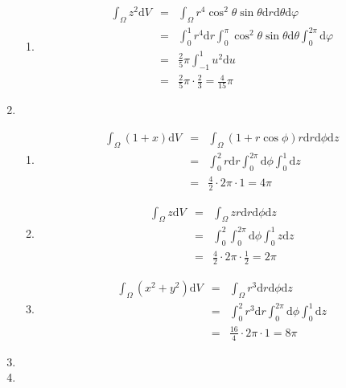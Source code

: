 \documentclass{jarticle}
\def\d{\mathrm d}
\begin{document}
\begin{enumerate}
\begin{enumerate}
        \item
          \begin{eqnarray*}
            \int_\Omega z^2 \d V & = & \int_\Omega r^4 \cos^2 \theta \sin \theta \d r \d \theta \d \varphi \\
            & = & \int_0^1 r^4 \d r \int_0^{\pi} \cos^2 \theta \sin \theta \d \theta \int_0^{2\pi} \d \varphi \\
            & = & \frac{2}{5} \pi \int_{-1}^{1} u^2 \d u \\
            & = & \frac{2}{5} \pi \cdot \frac{2}{3} = \frac{4}{15} \pi
          \end{eqnarray*}
      \end{enumerate}
    \item
      \begin{enumerate}
        \item
          \begin{eqnarray*}
            \int_\Omega (1+x) \d V & = & \int_\Omega (1+r \cos \phi) r \d r \d \phi \d z \\
            & = & \int_0^2 r \d r \int_0^{2\pi} \d \phi \int_0^1 \d z \\
            & = & \frac{4}{2} \cdot 2\pi \cdot 1 = 4 \pi
          \end{eqnarray*}
        \item
          \begin{eqnarray*}
            \int_\Omega z \d V & = & \int_\Omega z r \d r \d \phi \d z \\
            & = & \int_0^2 \int_0^{2\pi} \d \phi \int_0^1 z \d z \\
            & = & \frac{4}{2} \cdot 2\pi \cdot \frac{1}{2} = 2\pi
          \end{eqnarray*}
        \item
          \begin{eqnarray*}
            \int_\Omega (x^2+y^2) \d V & = & \int_\Omega r^3 \d r \d \phi \d z \\
            & = & \int_0^2 r^3 \d r \int_0^{2\pi} \d \phi \int_0^1 \d z \\
            & = & \frac{16}{4} \cdot 2\pi \cdot 1 = 8 \pi
          \end{eqnarray*}
      \end{enumerate}
    \item
    \item
  \end{enumerate}
\end{document}
